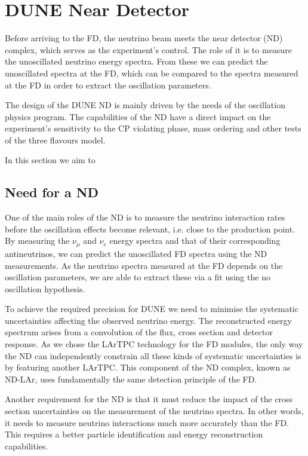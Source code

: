 \chapter{DUNE Near Detector}
\label{chapter:dune_nd}

Before arriving to the FD, the neutrino beam meets the near detector (ND) complex, which serves as the experiment's control. The role of it is to measure the unoscillated neutrino energy spectra. From these we can predict the unoscillated spectra at the FD, which can be compared to the spectra measured at the FD in order to extract the oscillation parameters.

The design of the DUNE ND is mainly driven by the needs of the oscillation physics program. The capabilities of the ND have a direct impact on the experiment's sensitivity to the CP violating phase, mass ordering and other tests of the three flavours model.

In this section we aim to  

\section{Need for a ND}

One of the main roles of the ND is to measure the neutrino interaction rates before the oscillation effects become relevant, i.e. close to the production point. By measuring the $\nu_{\mu}$ and $\nu_{e}$ energy spectra and that of their corresponding antineutrinos, we can predict the unoscillated FD spectra using the ND measurements. As the neutrino spectra measured at the FD depends on the oscillation parameters, we are able to extract these via a fit using the no oscillation hypothesis.

To achieve the required precision for DUNE we need to minimise the systematic uncertainties affecting the observed neutrino energy. The reconstructed energy spectrum arises from a convolution of the flux, cross section and detector response. As we chose the LArTPC technology for the FD modules, the only way the ND can independently constrain all these kinds of systematic uncertainties is by featuring another LArTPC. This component of the ND complex, known as ND-LAr, uses fundamentally the same detection principle of the FD.

Another requirement for the ND is that it must reduce the impact of the cross section uncertainties on the measurement of the neutrino spectra. In other words, it needs to measure neutrino interactions much more accurately than the FD. This requires a better particle identification and energy reconstruction capabilities.

